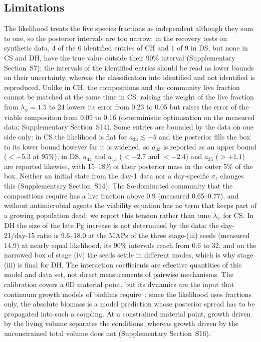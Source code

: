 \documentclass[preprint,12pt]{elsarticle}
\begin{document}
\subsection{Limitations}
\label{sec:limits}
The likelihood treats the five species fractions as independent although they sum to one, so the posterior intervals are too narrow: in the recovery tests on synthetic data, 4 of the 6 identified entries of CH and 1 of 9 in DS, but none in CS and DH, have the true value outside their 90\% interval (Supplementary Section~S7); the intervals of the identified entries should be read as lower bounds on their uncertainty, whereas the classification into identified and not identified is reproduced.
Unlike in CH, the compositions and the community live fraction cannot be matched at the same time in CS: raising the weight of the live fraction from $\lambda_\psi=1.5$ to 24 lowers its error from 0.23 to 0.05 but raises the error of the viable composition from 0.09 to 0.16 (deterministic optimisation on the measured data; Supplementary Section~S14).
Some entries are bounded by the data on one side only: in CS the likelihood is flat for $a_{33}\lesssim-5$ and the posterior fills the box to its lower bound however far it is widened, so $a_{33}$ is reported as an upper bound ($<-5.3$ at 95\%); in DS, $a_{44}$ and $a_{13}$ ($<-2.7$ and $<-2.4$) and $a_{25}$ ($>+1.1$) are reported likewise, with 15--18\% of their posterior mass in the outer 5\% of the box.
Neither an initial state from the day-1 data nor a day-specific $\sigma_\ell$ changes this (Supplementary Section~S14).
The So-dominated community that the compositions require has a live fraction above 0.9 (measured 0.65--0.77), and without antimicrobial agents the viability equation has no term that keeps part of a growing population dead; we report this tension rather than tune $\lambda_\psi$ for CS.
In DH the size of the late Pg increase is not determined by the data: the day-21/day-15 ratio is 9.6--18.0 at the MAPs of the three stage-(iii) seeds (measured 14.9) at nearly equal likelihood, its 90\% intervals reach from 0.6 to 32, and on the narrowed box of stage (iv) the seeds settle in different modes, which is why stage (iii) is final for DH.
The interaction coefficients are effective quantities of this model and data set, not direct measurements of pairwise mechanisms.
The calibration covers a 0D material point, but its dynamics are the input that continuum growth models of biofilms require~\citep{Klempt2024ContinuumGrowth}; since the likelihood uses fractions only, the absolute biomass is a model prediction whose posterior spread has to be propagated into such a coupling. At a constrained material point, growth driven by the living volume separates the conditions, whereas growth driven by the unconstrained total volume does not (Supplementary Section~S16).
\end{document}
